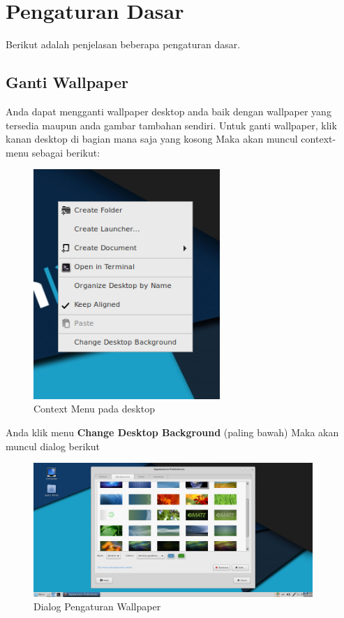 \documentclass[12pt,]{article}
\begin{document}
	\newpage
	\section{Pengaturan Dasar}

	Berikut adalah penjelasan beberapa pengaturan dasar.
	
	\subsection{Ganti Wallpaper}
	
	Anda dapat mengganti wallpaper desktop anda baik dengan wallpaper yang tersedia maupun anda gambar tambahan sendiri.
	Untuk ganti wallpaper, klik kanan desktop di bagian mana saja yang kosong
	Maka akan muncul context-menu sebagai berikut:
	
	\begin{figure}[!ht]
		\centering
		\includegraphics[width=200pt]{png/contextmenu}
		\caption{Context Menu pada desktop}
	\end{figure} 

	Anda klik menu \textbf{Change Desktop Background} (paling bawah)
	Maka akan muncul dialog berikut
	
	\begin{figure}[!ht]
		\centering
		\includegraphics[width=300pt]{png/wallpaperdlg}
		\caption{Dialog Pengaturan Wallpaper}
	\end{figure}
	
\end{document}
